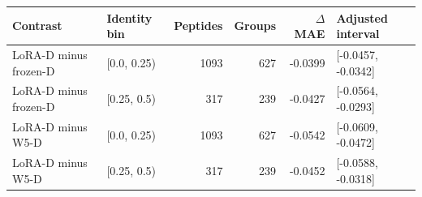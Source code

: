 
{\small\setlength{\tabcolsep}{4pt}
\begin{tabularx}{\textwidth}{Xlrrrl}
\toprule
Contrast & Identity bin & Peptides & Groups & $\Delta$MAE & Adjusted interval \\
\midrule
LoRA-D minus frozen-D & [0.0, 0.25) & 1093 & 627 & -0.0399 & [-0.0457, -0.0342] \\
LoRA-D minus frozen-D & [0.25, 0.5) & 317 & 239 & -0.0427 & [-0.0564, -0.0293] \\
LoRA-D minus W5-D & [0.0, 0.25) & 1093 & 627 & -0.0542 & [-0.0609, -0.0472] \\
LoRA-D minus W5-D & [0.25, 0.5) & 317 & 239 & -0.0452 & [-0.0588, -0.0318] \\
\bottomrule
\end{tabularx}}
